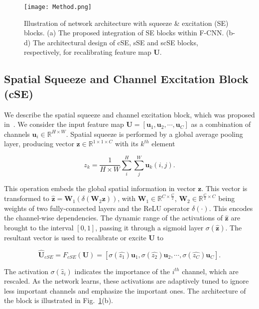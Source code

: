\documentclass{llncs}
\begin{document}
\begin{figure}[h]
\centering
\texttt{[image: Method.png]}
\vspace{-2mm}
\caption{Illustration of network architecture with squeeze \& excitation (SE) blocks. (a) The proposed integration of SE blocks within F-CNN. (b-d) The architectural design of  cSE, sSE and scSE blocks, respectively, for recalibrating feature map $\mathbf{U}$.
}
\label{fig:GA}
\end{figure}

\noindent
\subsection{Spatial Squeeze and Channel Excitation Block (cSE)}
We describe the spatial squeeze and channel excitation block, which was proposed in~\cite{SE2017}. We consider the input feature map $\mathbf{U} = [\mathbf{u}_1, \mathbf{u}_2, \cdots, \mathbf{u}_{C}]$ as a combination of channels $\mathbf{u}_i \in \mathbb{R}^{H \times W}$. Spatial squeeze is performed by a global average pooling layer, producing vector $\mathbf{z} \in \mathbb{R}^{1 \times 1 \times C}$ with its $k^{th}$ element

\begin{equation}
z_k = \frac{1}{H \times W} \sum_i^H \sum_j^W \mathbf{u}_k (i,j).
\end{equation}

\noindent
This operation embeds the global spatial information in vector $\mathbf{z}$. This vector is transformed to $\hat{\mathbf{z}}=\mathbf{W}_1 (\delta(\mathbf{W}_2 \mathbf{z}))$, with $\mathbf{W}_1 \in \mathbb{R}^{C \times \frac{C}{2}}$, $\mathbf{W}_2 \in \mathbb{R}^{\frac{C}{2} \times C}$ being weights of two fully-connected layers and the ReLU operator $\delta(\cdot)$. This encodes the channel-wise dependencies. The dynamic range of the activations of $\hat{\mathbf{z}}$ are brought to the interval $[0, 1]$, passing it through a sigmoid layer $\sigma(\hat{\mathbf{z}})$. The resultant vector is used to recalibrate or excite $\mathbf{U}$ to

\begin{equation}
\hat{\mathbf{U}}_{cSE} = F_{cSE}(\mathbf{U}) = [\sigma(\hat{z_1})\mathbf{u}_1, \sigma(\hat{z_2})\mathbf{u}_2, \cdots, \sigma(\hat{z_{C}})\mathbf{u}_{C}].
\end{equation}

\noindent
The activation $\sigma(\hat{z}_i)$ indicates the importance of the $i^{th}$ channel, which are rescaled. As the network learns, these activations are adaptively tuned to ignore less important channels and emphasize the important ones. The architecture of the block is illustrated in Fig.~\ref{fig:GA}(b).
\end{document}
